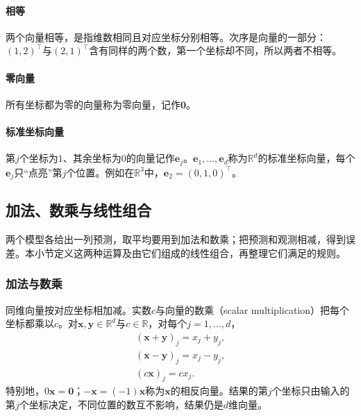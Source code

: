 \paragraph{相等} 两个向量相等，是指维数相同且对应坐标分别相等。次序是向量的一部分：$(1,2)^\top$与$(2,1)^\top$含有同样的两个数，第一个坐标却不同，所以两者不相等。

\paragraph{零向量} 所有坐标都为零的向量称为零向量，记作$\bm0$。

\paragraph{标准坐标向量} 第$j$个坐标为$1$、其余坐标为$0$的向量记作$\bm e_j$。$\bm e_1,\ldots,\bm e_d$称为$\mathbb R^d$的标准坐标向量，每个$\bm e_j$只“点亮”第$j$个位置。例如在$\mathbb R^3$中，$\bm e_2=(0,1,0)^\top$。

\subsection{加法、数乘与线性组合}
\label{sec:ls-vector-operations}

两个模型各给出一列预测，取平均要用到加法和数乘；把预测和观测相减，得到误差。本小节定义这两种运算及由它们组成的线性组合，再整理它们满足的规则。

\subsubsection{加法与数乘}
\label{sec:ls-addition-scaling}

同维向量按对应坐标相加减。实数$c$与向量的数乘（scalar multiplication）把每个坐标都乘以$c$。对$\bm x,\bm y\in\mathbb R^d$与$c\in\mathbb R$，对每个$j=1,\ldots,d$，
\[
 \begin{gathered}
 (\bm x+\bm y)_j=x_j+y_j,\\
 (\bm x-\bm y)_j=x_j-y_j,\\
 (c\bm x)_j=cx_j.
 \end{gathered}
\]
特别地，$0\bm x=\bm0$；$-\bm x=(-1)\bm x$称为$\bm x$的相反向量。结果的第$j$个坐标只由输入的第$j$个坐标决定，不同位置的数互不影响，结果仍是$d$维向量。

